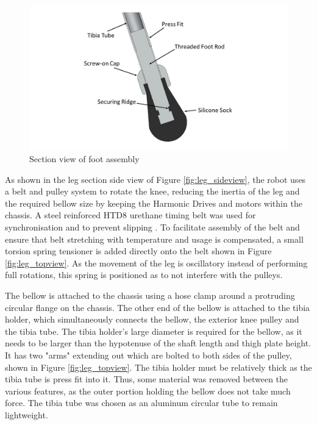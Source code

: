 \begin{figure} [H]
    \centering
    \includegraphics[width=\textwidth]{2_ProposedDesign/img/SectionFootA.jpg}
    \caption{Section view of foot assembly}
    \label{fig:foot}
\end{figure}

As shown in the leg section side view of Figure \ref{fig:leg_sideview}, the robot uses a belt and pulley system to rotate the knee, reducing the inertia of the leg and the required bellow size by keeping the Harmonic Drives and motors within the chassis. A steel reinforced HTD8 urethane timing belt was used for synchronisation and to prevent slipping \cite{gates_mectrol_urethane_2018}. To facilitate assembly of the belt and ensure that belt stretching with temperature and usage is compensated, a small torsion spring tensioner is added directly onto the belt shown in Figure \ref{fig:leg_topview}. As the movement of the leg is oscillatory instead of performing full rotations, this spring is positioned as to not interfere with the pulleys. 

The bellow is attached to the chassis using a hose clamp around a protruding circular flange on the chassis. The other end of the bellow is attached to the tibia holder, which simultaneously connects the bellow, the exterior knee pulley and the tibia tube. The tibia holder's large diameter is required for the bellow, as it needs to be larger than the hypotenuse of the shaft length and thigh plate height. It has two "arms" extending out which are bolted to both sides of the pulley, shown in Figure \ref{fig:leg_topview}. The tibia holder must be relatively thick as the tibia tube is press fit into it. Thus, some material was removed between the various features, as the outer portion holding the bellow does not take much force. The tibia tube was chosen as an aluminum circular tube to remain lightweight.

